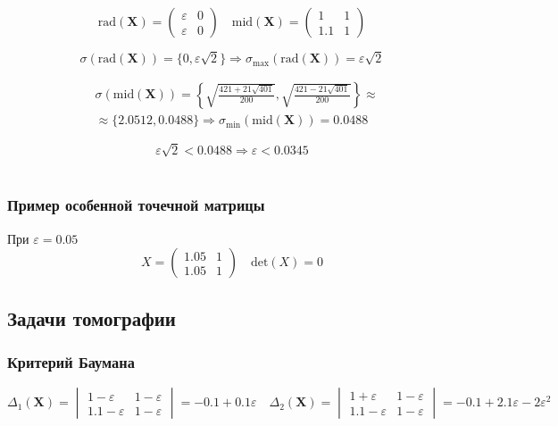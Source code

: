 \begin{equation}
\mathrm{rad}(\textbf{X})=
\begin{pmatrix}
\varepsilon & 0 \\
\varepsilon & 0 
\end{pmatrix}
\quad
\mathrm{mid}(\textbf{X})=
\begin{pmatrix}
1 & 1 \\
1.1 & 1 
\end{pmatrix}
\end{equation}

\begin{equation}
    \sigma(\mathrm{rad}(\mathbf{X}))=\{0,\varepsilon\sqrt{2}\}\Rightarrow\sigma_{\mathrm{max}}(\mathrm{rad}(\mathbf{X}))=\varepsilon\sqrt{2}
\end{equation}

\begin{equation}
\begin{split}
    &\sigma(\mathrm{mid}(\mathbf{X}))=\left\{\sqrt{\frac{421+21\sqrt{401}}{200}},\sqrt{\frac{421-21\sqrt{401}}{200}}\right\}\approx\\
    &\approx\{2.0512, 0.0488\}\Rightarrow\sigma_{\mathrm{min}}(\mathrm{mid}(\mathbf{X}))=0.0488
\end{split}
\end{equation}

\begin{equation}
    \varepsilon\sqrt{2}<0.0488\Rightarrow\varepsilon<0.0345
\end{equation}
\\
\subsubsection{Пример особенной точечной матрицы}
При $\varepsilon=0.05$
\begin{equation}
X=
\begin{pmatrix}
1.05 & 1 \\
1.05 & 1 
\end{pmatrix}
\quad
\mathrm{det}(X)=0
\end{equation}

\subsection{Задачи томографии}
\subsubsection{Критерий Баумана}
\begin{equation}
\Delta_1(\textbf{X})=
\begin{vmatrix}
1-\varepsilon & 1-\varepsilon \\
1.1-\varepsilon & 1-\varepsilon 
\end{vmatrix}
=-0.1+0.1\varepsilon 
\quad
\Delta_2(\textbf{X})=
\begin{vmatrix}
1+\varepsilon & 1-\varepsilon \\
1.1-\varepsilon & 1-\varepsilon 
\end{vmatrix}
=-0.1+2.1\varepsilon-2\varepsilon^2
\end{equation}

